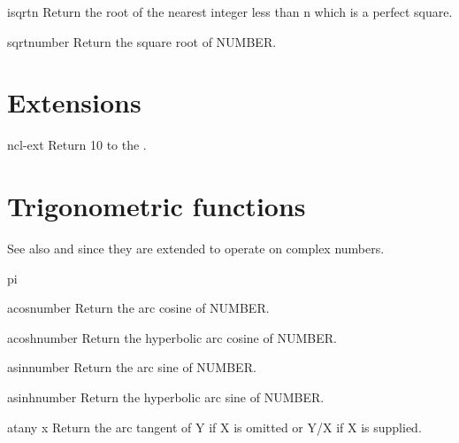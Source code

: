 \begin{function}{isqrt}{n}{}{}
  Return the root of the nearest integer less than n which is a perfect
   square.
\end{function}

\begin{function}{sqrt}{number}{}{}
  Return the square root of NUMBER.
\end{function}

\section{Extensions}
\label{sec:exp-extensions}

\begin{function}{10}{n}{cl-ext}{}
  Return 10 to the .
\end{function}

\section{Trigonometric functions}
\label{sec:trig-funct}

See also  and  since they are extended to operate
on complex numbers.

\begin{constant}{pi}{}{}{}
  
\end{constant}

\begin{function}{acos}{number}{}{}
  Return the arc cosine of NUMBER.
\end{function}

\begin{function}{acosh}{number}{}{}
  Return the hyperbolic arc cosine of NUMBER.
\end{function}

\begin{function}{asin}{number}{}{}
  Return the arc sine of NUMBER.
\end{function}

\begin{function}{asinh}{number}{}{}
  Return the hyperbolic arc sine of NUMBER.
\end{function}

\begin{function}{atan}{y \op x}{}{}
  Return the arc tangent of Y if X is omitted or Y/X if X is supplied.
\end{function}

